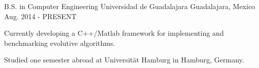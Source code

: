 \begin{cventries}
    \cventry
        {B.S. in Computer Engineering}
        {Universidad de Guadalajara}
        {Guadalajara, Mexico}
        {Aug. 2014 - PRESENT}
        {
            \begin{cvitems}
                \item {Currently developing a C++/Matlab framework for implementing and benchmarking evolutive algorithms.}
                \item {Studied one semester abroad at Universität Hamburg in Hamburg, Germany.}
            \end{cvitems}
        }
\end{cventries}
